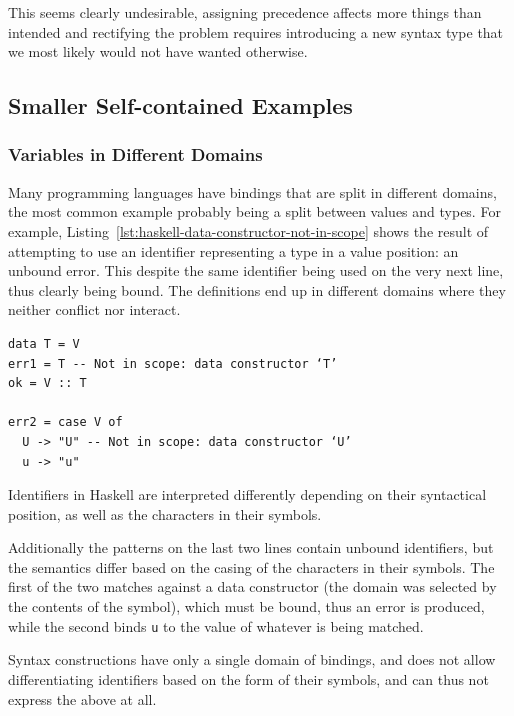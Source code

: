 \documentclass{kththesis}
\begin{document}
This seems clearly undesirable, assigning precedence affects more things than intended and rectifying the problem requires introducing a new syntax type that we most likely would not have wanted otherwise.

\subsection{Smaller Self-contained Examples}

\subsubsection{Variables in Different Domains}


Many programming languages have bindings that are split in different domains, the most common example probably being a split between values and types. For example, Listing~\ref{lst:haskell-data-constructor-not-in-scope} shows the result of attempting to use an identifier representing a type in a value position: an unbound error. This despite the same identifier being used on the very next line, thus clearly being bound. The definitions end up in different domains where they neither conflict nor interact.

\begin{listing}[h]
\begin{verbatim}
data T = V
err1 = T -- Not in scope: data constructor ‘T’
ok = V :: T

err2 = case V of
  U -> "U" -- Not in scope: data constructor ‘U’
  u -> "u"
\end{verbatim}
\caption{Identifiers in Haskell are interpreted differently depending on their syntactical position, as well as the characters in their symbols.}
\label{lst:haskell-data-constructor-not-in-scope}
\end{listing}

Additionally the patterns on the last two lines contain unbound identifiers, but the semantics differ based on the casing of the characters in their symbols. The first of the two matches against a data constructor (the domain was selected by the contents of the symbol), which must be bound, thus an error is produced, while the second binds \texttt{u} to the value of whatever is being matched.

Syntax constructions have only a single domain of bindings, and does not allow differentiating identifiers based on the form of their symbols, and can thus not express the above at all.
\end{document}
